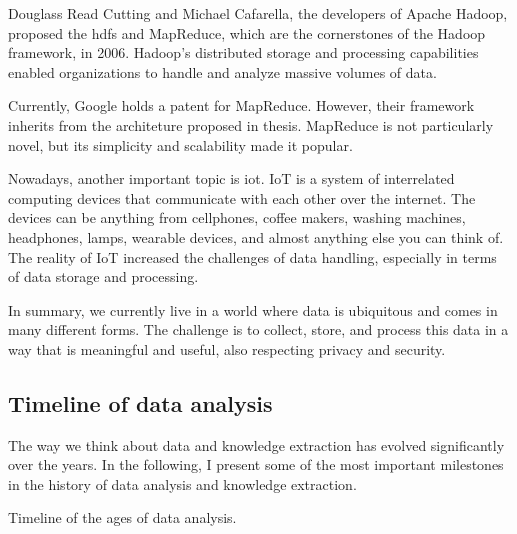 Douglass Read Cutting and Michael Cafarella, the developers of Apache Hadoop,
proposed the \gls{hdfs} and MapReduce, which are the
cornerstones of the Hadoop framework, in 2006.  Hadoop's distributed storage and
processing capabilities enabled organizations to handle and analyze massive volumes of
data.

Currently, Google holds a patent for
MapReduce.
However, their framework inherits from the architeture proposed in
\textcite{Hillis1985} thesis.
MapReduce is not particularly novel, but its simplicity and scalability made it popular.

Nowadays, another important topic is \gls{iot}.  IoT is a system of
interrelated computing devices that communicate with each other over the internet.
The devices can be anything from cellphones, coffee makers, washing machines, headphones,
lamps, wearable devices, and almost anything else you can think of.  The reality of IoT increased the
challenges of data handling, especially in terms of data storage and processing.

In summary, we currently live in a world where data is ubiquitous and comes in many
different forms.  The challenge is to collect, store, and process this data in a way that
is meaningful and useful, also respecting privacy and security.

\subsection{Timeline of data analysis}
\label{sub:time-analysis}

The way we think about data and knowledge extraction has evolved significantly over the
years.  In the following, I present some of the most important milestones in the history
of data analysis and knowledge extraction.

\begin{figurebox}[label=fig:data-analysis-history]{Timeline of the ages of data analysis.}
  \centering
\end{figurebox}


